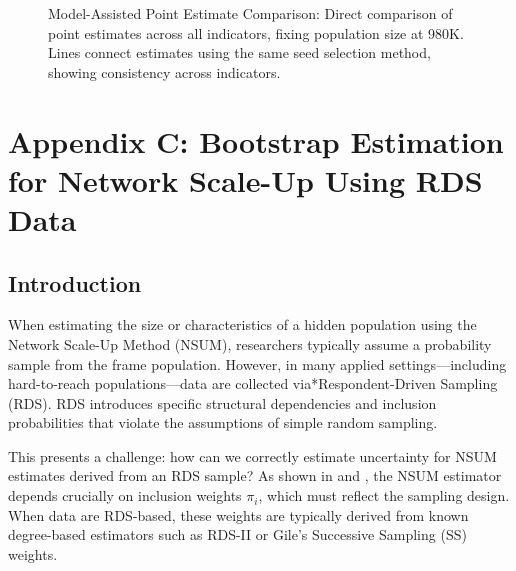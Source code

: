 \documentclass[
  12pt,
  letterpaper,
  DIV=11,
  numbers=noendperiod]{scrartcl}
\theoremstyle{plain}
\theoremstyle{definition}
\begin{document}
\begin{figure}[H]


\caption{\label{fig-ma-sensitivity-comparison}Model-Assisted Point
Estimate Comparison: Direct comparison of point estimates across all
indicators, fixing population size at 980K. Lines connect estimates
using the same seed selection method, showing consistency across
indicators.}

\end{figure}%

\section{Appendix C: Bootstrap Estimation for Network Scale-Up Using RDS
Data}\label{app-3step}

\subsection{Introduction}\label{introduction}

When estimating the size or characteristics of a hidden population using
the Network Scale-Up Method (NSUM), researchers typically assume a
probability sample from the frame population. However, in many applied
settings---including hard-to-reach populations---data are collected
via*Respondent-Driven Sampling (RDS). RDS introduces specific structural
dependencies and inclusion probabilities that violate the assumptions of
simple random sampling.

This presents a challenge: how can we correctly estimate uncertainty for
NSUM estimates derived from an RDS sample? As shown in
\textcite{feeh16-generalized} and \textcite{salg06-variance}, the NSUM
estimator depends crucially on inclusion weights \(\pi_i\), which must
reflect the sampling design. When data are RDS-based, these weights are
typically derived from known degree-based estimators such as RDS-II or
Gile's Successive Sampling (SS) weights.
\end{document}
